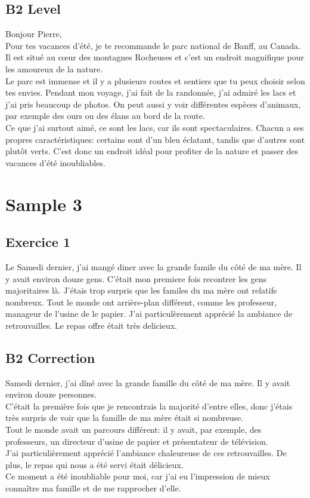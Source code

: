\documentclass{book}
\begin{document}
        \subsection*{B2 Level}
            Bonjour Pierre, 
            \\
            Pour tes vacances d'été, je te recommande le parc national de Banff, au Canada. 
            Il est situé au cœur des montagnes Rocheuses et c'est un endroit magnifique pour les amoureux de la nature.
            \\
            Le parc est immense et il y a plusieurs routes et sentiers que tu peux choisir selon tes envies. 
            Pendant mon voyage, j'ai fait de la randonnée, j'ai admiré les lacs et j'ai pris beaucoup de photos. 
            On peut aussi y voir différentes espèces d'animaux, par exemple des ours ou des élans au bord de la route.
            \\
            Ce que j'ai surtout aimé, ce sont les lacs, car ils sont spectaculaires. Chacun a ses propres caractéristiques: certains sont d'un bleu éclatant, tandis que d'autres sont plutôt verts.
            C'est donc un endroit idéal pour profiter de la nature et passer des vacances d'été inoubliables.
    \newpage
    \section{Sample 3}
        \subsection{Exercice 1}
            Le Samedi dernier, j'ai mangé diner avec la grande famile du côté de ma mère. Il y avait environ douze gens. 
            C'était mon premiere fois recontrer les gens majoritaires là. 
            J'étais trop surpris que les familes du ma mère ont relatifs nombreux.
            Tout le monde ont arrière-plan différent, comme les professeur, manageur de l'usine de le papier.
            J'ai particulèrement apprécié la ambiance de retrouvailles. Le repas offre était très delicieux.
            
        \subsection*{B2 Correction}
            Samedi dernier, j'ai dîné avec la grande famille du côté de ma mère. Il y avait environ douze personnes.
            \\
            C'était la première fois que je rencontrais la majorité d'entre elles, donc j'étais très surpris de voir que la famille de ma mère était si nombreuse. \\
            Tout le monde avait un parcours différent: il y avait, par exemple, des professeurs, un directeur d'usine de papier et présentateur de télévision.
            \\
            J'ai particulièrement apprécié l'ambiance chaleureuse de ces retrouvailles. De plus, le repas qui nous a été servi était délicieux.
            \\
            Ce moment a été inoubliable pour moi, car j'ai eu l'impression de mieux connaître ma famille et de me rapprocher d'elle.
        
\end{document}
